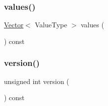 \mbox{\label{classMap_a50ccbe4184324f0da975648a12728d20}} 
\subsubsection{\texorpdfstring{values()}{values()}}
{\footnotesize\ttfamily \mbox{\hyperlink{classVector}{Vector}}$<$ Value\+Type $>$ values (\begin{DoxyParamCaption}{ }\end{DoxyParamCaption}) const}

\mbox{\label{classMap_a0aa696ccb72cbf928535d6b646bac1aa}} 
\subsubsection{\texorpdfstring{version()}{version()}}
{\footnotesize\ttfamily unsigned int version (\begin{DoxyParamCaption}{ }\end{DoxyParamCaption}) const}


